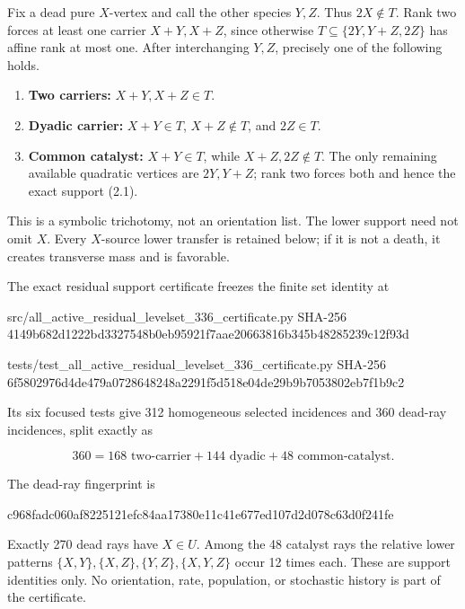 Fix a dead pure \(X\)-vertex and call the other species \(Y,Z\). Thus
\(2X\notin T\). Rank two forces at least one carrier \(X+Y,X+Z\), since
otherwise \(T\subseteq\{2Y,Y+Z,2Z\}\) has affine rank at most one. After
interchanging \(Y,Z\), precisely one of the following holds.

\begin{enumerate}
\def\labelenumi{\arabic{enumi}.}
\tightlist
\item
  \textbf{Two carriers:} \(X+Y,X+Z\in T\).
\item
  \textbf{Dyadic carrier:} \(X+Y\in T\), \(X+Z\notin T\), and
  \(2Z\in T\).
\item
  \textbf{Common catalyst:} \(X+Y\in T\), while \(X+Z,2Z\notin T\). The
  only remaining available quadratic vertices are \(2Y,Y+Z\); rank two
  forces both and hence the exact support (2.1).
\end{enumerate}

This is a symbolic trichotomy, not an orientation list. The lower
support need not omit \(X\). Every \(X\)-source lower transfer is
retained below; if it is not a death, it creates transverse mass and is
favorable.

The exact residual support certificate freezes the finite set identity
at

\begin{CodeBlock}
src/all_active_residual_levelset_336_certificate.py
SHA-256 4149b682d1222bd3327548b0eb95921f7aae20663816b345b48285239c12f93d

tests/test_all_active_residual_levelset_336_certificate.py
SHA-256 6f5802976d4de479a0728648248a2291f5d518e04de29b9b7053802eb7f1b9c2
\end{CodeBlock}

Its six focused tests give 312 homogeneous selected incidences and 360
dead-ray incidences, split exactly as

\[
              360=168\text{ two-carrier}
                    +144\text{ dyadic}
                    +48\text{ common-catalyst}.       \tag{3.1}
\]

The dead-ray fingerprint is

\begin{CodeBlock}
c968fadc060af8225121efc84aa17380e11c41e677ed107d2d078c63d0f241fe
\end{CodeBlock}

Exactly 270 dead rays have \(X\in U\). Among the 48 catalyst rays the
relative lower patterns \(\{X,Y\},\{X,Z\},\{Y,Z\},\{X,Y,Z\}\) occur 12
times each. These are support identities only. No orientation, rate,
population, or stochastic history is part of the certificate.

